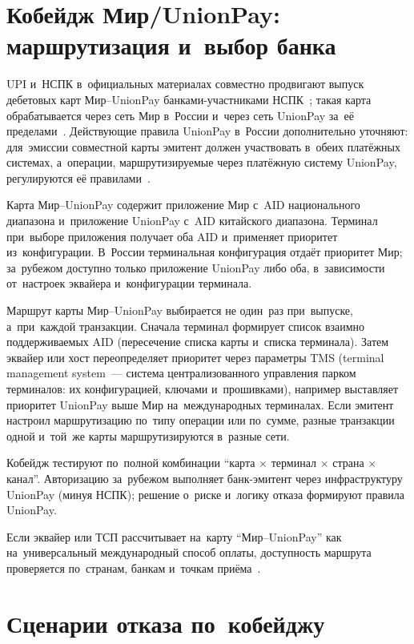 \section{Кобейдж Мир/UnionPay: маршрутизация и~выбор банка}\label{sec:up-mir}

UPI и~НСПК в~официальных материалах совместно продвигают выпуск дебетовых карт
Мир--UnionPay банками-участниками НСПК~\cite{unionpay-mir-cobadge}; такая карта
обрабатывается через сеть Мир в~России и~через сеть UnionPay за~её
пределами~\cite{unionpay-mir-cobadge}. Действующие правила UnionPay в~России
дополнительно уточняют: для~эмиссии совместной карты эмитент должен участвовать
в~обеих платёжных системах, а~операции, маршрутизируемые через платёжную систему
UnionPay, регулируются её правилами~\cite{unionpay-russia-rules}.

Карта Мир--UnionPay содержит приложение Мир с~AID национального
диапазона и~приложение UnionPay с~AID китайского диапазона. Терминал при~выборе
приложения получает оба AID и~применяет приоритет из~конфигурации. В~России
терминальная конфигурация отдаёт приоритет Мир; за~рубежом доступно только
приложение UnionPay либо оба, в~зависимости от~настроек эквайера и~конфигурации
терминала.

Маршрут карты Мир--UnionPay выбирается не один~раз при~выпуске, а~при~каждой
транзакции. Сначала терминал формирует список взаимно поддерживаемых AID
(пересечение списка карты и~списка терминала). Затем эквайер или хост
переопределяет приоритет через параметры TMS (terminal management system~---
  система централизованного управления парком терминалов: их конфигурацией,
ключами и~прошивками), например выставляет приоритет UnionPay выше Мир
на~международных терминалах. Если эмитент настроил маршрутизацию по~типу
операции или по~сумме, разные транзакции одной и~той~же карты маршрутизируются
в~разные сети.

Кобейдж тестируют по~полной комбинации \enquote{карта $\times$
терминал $\times$ страна $\times$ канал}. Авторизацию за~рубежом выполняет
банк-эмитент через инфраструктуру UnionPay (минуя НСПК); решение о~риске
и~логику отказа формируют правила UnionPay.

Если эквайер или ТСП рассчитывает на~карту \enquote{Мир--UnionPay} как
на~универсальный международный способ оплаты, доступность маршрута проверяется
по~странам, банкам и~точкам приёма~\cite{unionpay-mir-cobadge}.

\section{Сценарии отказа по~кобейджу}\label{sec:up-cobadge-decline}

